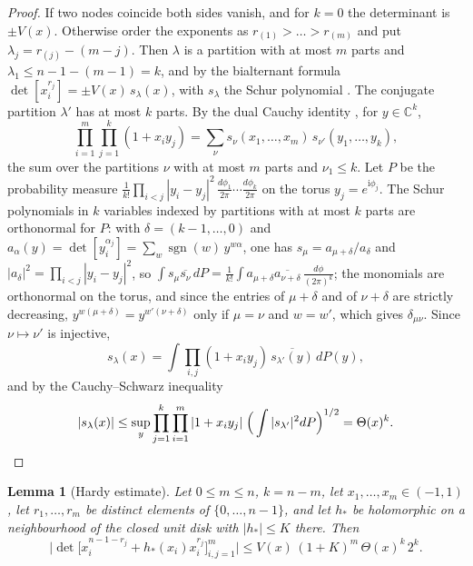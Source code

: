 \documentclass[11pt]{article}
\newtheorem{lemma}[theorem]{Lemma}
\theoremstyle{definition}
\begin{document}
\begin{proof}
If two nodes coincide both sides vanish, and for $k=0$ the determinant is $\pm V(x)$. Otherwise order the exponents as $r_{(1)}>\dots>r_{(m)}$ and put $\lambda_j=r_{(j)}-(m-j)$. Then $\lambda$ is a partition with at most $m$ parts and $\lambda_1\le n-1-(m-1)=k$, and by the bialternant formula $\det[x_i^{r_j}]=\pm V(x)\,s_\lambda(x)$, with $s_\lambda$ the Schur polynomial \cite[Chapter~I, Section~3]{Macdonald}. The conjugate partition $\lambda'$ has at most $k$ parts. By the dual Cauchy identity \cite[Chapter~I, Section~4]{Macdonald}, for $y\in\mathbb C^k$,
\[
\prod_{i=1}^m\prod_{j=1}^k(1+x_iy_j)=\sum_\nu s_\nu(x_1,\dots,x_m)\,s_{\nu'}(y_1,\dots,y_k),
\]
the sum over the partitions $\nu$ with at most $m$ parts and $\nu_1\le k$. Let $P$ be the probability measure $\frac1{k!}\prod_{i<j}|y_i-y_j|^2\,\frac{d\phi_1}{2\pi}\cdots\frac{d\phi_k}{2\pi}$ on the torus $y_j=e^{\mathrm i\phi_j}$. The Schur polynomials in $k$ variables indexed by partitions with at most $k$ parts are orthonormal for $P$: with $\delta=(k-1,\dots,0)$ and $a_\alpha(y)=\det[y_i^{\alpha_j}]=\sum_{w}\operatorname{sgn}(w)\,y^{w\alpha}$, one has $s_\mu=a_{\mu+\delta}/a_\delta$ and $|a_\delta|^2=\prod_{i<j}|y_i-y_j|^2$, so $\int s_\mu\overline{s_\nu}\,dP=\frac1{k!}\int a_{\mu+\delta}\overline{a_{\nu+\delta}}\,\frac{d\phi}{(2\pi)^k}$; the monomials are orthonormal on the torus, and since the entries of $\mu+\delta$ and of $\nu+\delta$ are strictly decreasing, $y^{w(\mu+\delta)}=y^{w'(\nu+\delta)}$ only if $\mu=\nu$ and $w=w'$, which gives $\delta_{\mu\nu}$. Since $\nu\mapsto\nu'$ is injective,
\[
s_\lambda(x)=\int\prod_{i,j}(1+x_iy_j)\,\overline{s_{\lambda'}(y)}\,dP(y),
\]
and by the Cauchy--Schwarz inequality
\[
|s_\lambda(x)|\le\sup_{y}\prod_{j=1}^k\prod_{i=1}^m|1+x_iy_j|\;\Big(\int|s_{\lambda'}|^2dP\Big)^{1/2}=\Theta(x)^k. \qedhere
\]
\end{proof}

\begin{lemma}[Hardy estimate]\label{xlem:hardy}
Let $0\le m\le n$, $k=n-m$, let $x_1,\dots,x_m\in(-1,1)$, let $r_1,\dots,r_m$ be distinct elements of $\{0,\dots,n-1\}$, and let $h_*$ be holomorphic on a neighbourhood of the closed unit disk with $|h_*|\le K$ there. Then
\[
\Big|\det\big[x_i^{n-1-r_j}+h_*(x_i)x_i^{r_j}\big]_{i,j=1}^m\Big|\le V(x)\,(1+K)^m\,\Theta(x)^k\,2^k .
\]
\end{lemma}
\end{document}

